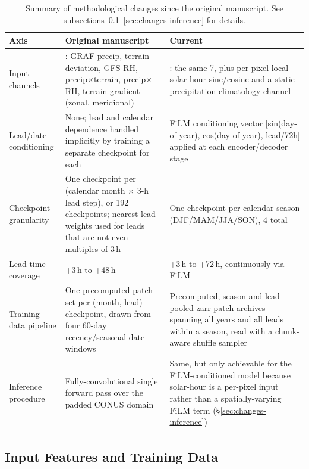 \documentclass[11pt]{article}
\begin{document}
\begin{table}[H]
\centering
\caption{Summary of methodological changes since the original
  manuscript. See subsections~\ref{sec:changes-features}--\ref{sec:changes-inference}
  for details.
  }
\label{tab:summary}
\medskip
\begin{tabular}{>{\raggedright\arraybackslash}p{3.3cm}>{\raggedright\arraybackslash}p{5.4cm}>{\raggedright\arraybackslash}p{5.4cm}}
\toprule
\textbf{Axis} & \textbf{Original manuscript} & \textbf{Current} \\
\midrule
Input channels &
  7: GRAF precip, terrain deviation, GFS RH, precip$\times$terrain,
  precip$\times$RH, terrain gradient (zonal, meridional) &
  10: the same 7, plus per-pixel local-solar-hour sine/cosine and a
  static precipitation climatology channel \\
\addlinespace
Lead/date conditioning &
  None; lead and calendar dependence handled implicitly by training a
  separate checkpoint for each &
  FiLM conditioning vector [sin(day-of-year), cos(day-of-year),
  lead/72h] applied at each encoder/decoder stage \\
\addlinespace
Checkpoint granularity &
  One checkpoint per (calendar month $\times$ 3-h lead step),
  or 192 checkpoints; nearest-lead weights used for
  leads that are not even multiples of 3\,h &
  One checkpoint per calendar season (DJF/MAM/JJA/SON), 4 total \\
\addlinespace
Lead-time coverage &
  +3\,h to +48\,h &
  +3\,h to +72\,h, continuously via FiLM \\
\addlinespace
Training-data pipeline &
  One precomputed patch set per (month, lead) checkpoint, drawn from
  four 60-day recency/seasonal date windows &
  Precomputed, season-and-lead-pooled zarr patch archives spanning all
  years and all leads within a season, read with a chunk-aware
  shuffle sampler \\
\addlinespace
Inference procedure &
  Fully-convolutional single forward pass over the padded CONUS domain
  &
  Same, but only achievable for the FiLM-conditioned model because
  solar-hour is a per-pixel input rather than a spatially-varying FiLM
  term (\S\ref{sec:changes-inference}) \\
\bottomrule
\end{tabular}
\end{table}

\subsection{Input Features and Training Data}
\label{sec:changes-features}
\end{document}
